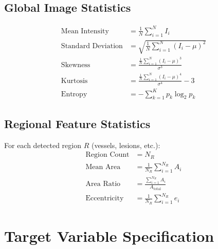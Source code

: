\documentclass[11pt]{article}
\begin{document}
\subsection{Global Image Statistics}
\begin{equation}
\begin{aligned}
\text{Mean Intensity} &= \frac{1}{N}\sum_{i=1}^{N} I_i \\
\text{Standard Deviation} &= \sqrt{\frac{1}{N}\sum_{i=1}^{N} (I_i - \mu)^2} \\
\text{Skewness} &= \frac{\frac{1}{N}\sum_{i=1}^{N} (I_i - \mu)^3}{\sigma^3} \\
\text{Kurtosis} &= \frac{\frac{1}{N}\sum_{i=1}^{N} (I_i - \mu)^4}{\sigma^4} - 3 \\
\text{Entropy} &= -\sum_{k=1}^{K} p_k \log_2 p_k
\end{aligned}
\end{equation}

\subsection{Regional Feature Statistics}
For each detected region $R$ (vessels, lesions, etc.):
\begin{equation}
\begin{aligned}
\text{Region Count} &= N_R \\
\text{Mean Area} &= \frac{1}{N_R}\sum_{i=1}^{N_R} A_i \\
\text{Area Ratio} &= \frac{\sum_{i=1}^{N_R} A_i}{A_{\text{total}}} \\
\text{Eccentricity} &= \frac{1}{N_R}\sum_{i=1}^{N_R} e_i
\end{aligned}
\end{equation}

\section{Target Variable Specification}
\end{document}
